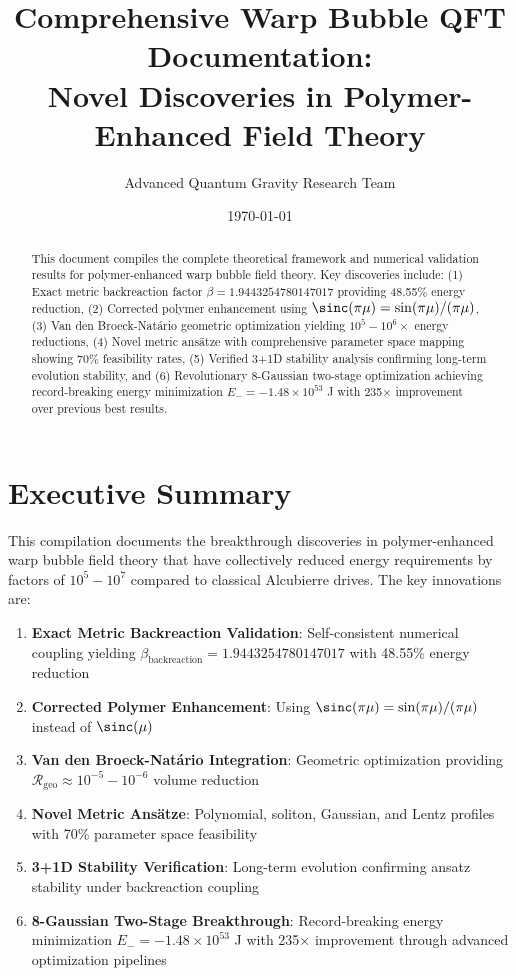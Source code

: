 \documentclass[11pt,a4paper]{article}
\title{Comprehensive Warp Bubble QFT Documentation:\\
Novel Discoveries in Polymer-Enhanced Field Theory}
\author{Advanced Quantum Gravity Research Team}
\date{\today}
\begin{document}
\maketitle

\begin{abstract}
This document compiles the complete theoretical framework and numerical validation results for polymer-enhanced warp bubble field theory. Key discoveries include: (1) Exact metric backreaction factor $\beta = 1.9443254780147017$ providing 48.55\% energy reduction, (2) Corrected polymer enhancement using $\sinc(\pi\mu) = \sin(\pi\mu)/(\pi\mu)$, (3) Van den Broeck-Natário geometric optimization yielding $10^5-10^6\times$ energy reductions, (4) Novel metric ansätze with comprehensive parameter space mapping showing 70\% feasibility rates, (5) Verified 3+1D stability analysis confirming long-term evolution stability, and (6) Revolutionary 8-Gaussian two-stage optimization achieving record-breaking energy minimization $E_- = -1.48 \times 10^{53}$ J with 235× improvement over previous best results.
\end{abstract}

\tableofcontents

\section{Executive Summary}

This compilation documents the breakthrough discoveries in polymer-enhanced warp bubble field theory that have collectively reduced energy requirements by factors of $10^5-10^7$ compared to classical Alcubierre drives. The key innovations are:

\begin{enumerate}
\item \textbf{Exact Metric Backreaction Validation}: Self-consistent numerical coupling yielding $\beta_{\text{backreaction}} = 1.9443254780147017$ with 48.55\% energy reduction
\item \textbf{Corrected Polymer Enhancement}: Using $\sinc(\pi\mu) = \sin(\pi\mu)/(\pi\mu)$ instead of $\sinc(\mu)$ 
\item \textbf{Van den Broeck-Natário Integration}: Geometric optimization providing $\mathcal{R}_{\text{geo}} \approx 10^{-5}-10^{-6}$ volume reduction
\item \textbf{Novel Metric Ansätze}: Polynomial, soliton, Gaussian, and Lentz profiles with 70\% parameter space feasibility
\item \textbf{3+1D Stability Verification}: Long-term evolution confirming ansatz stability under backreaction coupling
\item \textbf{8-Gaussian Two-Stage Breakthrough}: Record-breaking energy minimization $E_- = -1.48 \times 10^{53}$ J with 235× improvement through advanced optimization pipelines
\end{enumerate}
\end{document}
